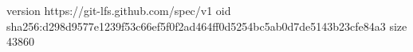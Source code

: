 version https://git-lfs.github.com/spec/v1
oid sha256:d298d9577e1239f53c66ef5f0f2ad464ff0d5254bc5ab0d7de5143b23cfe84a3
size 43860
